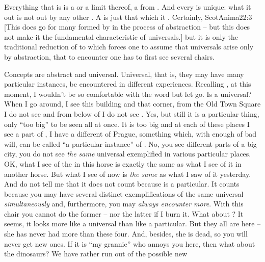 \pa
Everything that is is a  or a limit thereof, a  from
.  And every  is unique: what it
 out is not  out by any other .  A  is
just that which it .  Certainly, \citet{it is impossible to
abstract universals from the singular without previous knowledge of
the singular}{ScotAnima}{22:3 [This does go for 
many  formed by  in the process of 
abstraction -- but this does not make it the fundamental 
characteristic of universals.]}
but it is only the traditional reduction of
 to  which forces one to assume that universals 
arise only by abstraction, that to encounter  one has to first see
several chairs. 
%
\begin{itemize}\MyLPar
\ans Concepts are abstract and universal. Universal, that is, they may have 
many particular instances, be encountered in different experiences.
\que Recalling , at this moment, I wouldn't be so 
comfortable with the 
word  but let go. Is  a universal?
When I go around, I see this building and that corner, from the Old Town 
Square I do not see  and from below of  
I do not see .
\ans Yes, but still it is a particular thing, only ``too big'' to be seen 
all at once.
\que It is too big and at each of these places I see a 
part of , I have a different  of Prague, something 
which, with enough of bad will, can be called ``a particular instance'' of 
.
\ans No, you see different parts of a big city, you do not see {\em the 
same} universal exemplified in various particular places.
\que OK, what I see of the  in this  horse is exactly the same 
as what I see of it in another horse. But what I see of  
now is {\em the same} as what I saw of it yesterday. And do not tell me 
that it does not count because  is a particular.
\ans It counts because  you may have several 
distinct exemplifications of the same universal {\em simultaneously} and, 
furthermore, you may {\em always encounter more}. With this chair you cannot 
do the former -- nor the latter if I burn it.
\que What about ? It seems, it looks more 
like a universal than like a particular. But they all are here -- she has 
never had more than these four. And, besides, she is dead, so you will never 
get new ones. If it is ``my grannie'' who annoys you here, then what 
about the dinosaurs? We have rather run out of the possible new

\end{itemize}
